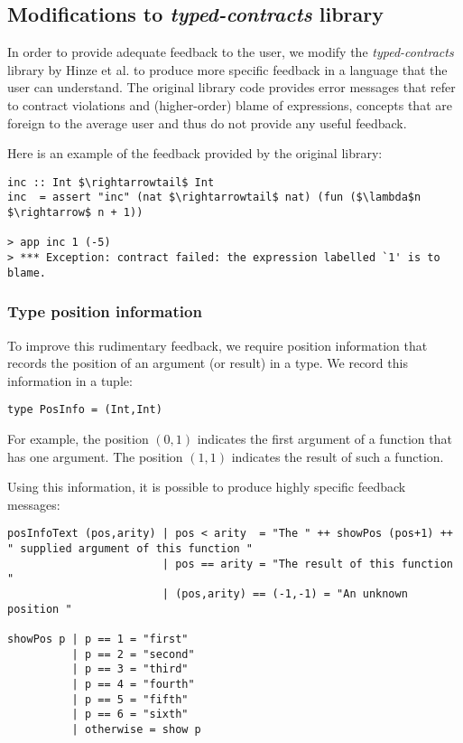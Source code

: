 \documentclass[10pt]{report}
\begin{document}
\subsection{Modifications to \textit{typed-contracts} library}
\label{modificationstotypedcontracts}
In order to provide adequate feedback to the user, we modify the \textit{typed-contracts} library by Hinze et al. \cite{Hinze06typedcontracts} to produce more specific feedback in a language that the user can understand.
The original library code provides error messages that refer to contract violations and (higher-order) blame of expressions, concepts that are foreign to the average user and thus do not provide any useful feedback.

Here is an example of the feedback provided by the original library:

\begin{lstlisting}[mathescape]
inc :: Int $\rightarrowtail$ Int
inc  = assert "inc" (nat $\rightarrowtail$ nat) (fun ($\lambda$n $\rightarrow$ n + 1))

> app inc 1 (-5)
> *** Exception: contract failed: the expression labelled `1' is to blame.
\end{lstlisting}

\subsubsection{Type position information}

To improve this rudimentary feedback, we require position information that records the position of an argument (or result) in a type.
We record this information in a tuple:

\begin{lstlisting}
type PosInfo = (Int,Int)
\end{lstlisting}

For example, the position $(0,1)$ indicates the first argument of a function that has one argument.
The position $(1,1)$ indicates the result of such a function.

Using this information, it is possible to produce highly specific feedback messages:

\begin{lstlisting}[caption=Code that generates text indicating the location of the problem.]
posInfoText (pos,arity) | pos < arity  = "The " ++ showPos (pos+1) ++ " supplied argument of this function "
                        | pos == arity = "The result of this function "
                        | (pos,arity) == (-1,-1) = "An unknown position "

showPos p | p == 1 = "first"
          | p == 2 = "second"
          | p == 3 = "third"
          | p == 4 = "fourth"
          | p == 5 = "fifth"
          | p == 6 = "sixth"
          | otherwise = show p
\end{lstlisting}
\end{document}
